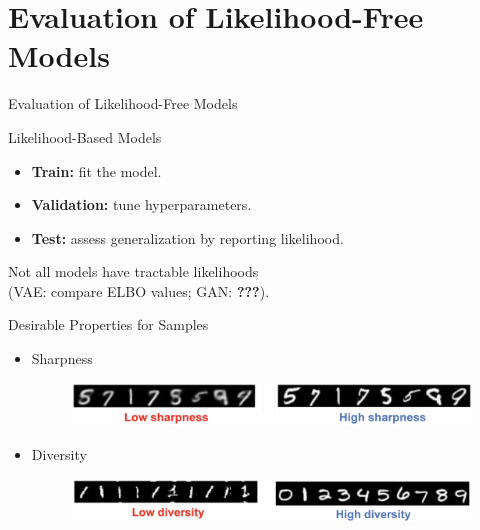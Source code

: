 \documentclass{beamer}
\begin{document}
\section{Evaluation of Likelihood-Free Models}
\begin{frame}{Evaluation of Likelihood-Free Models}
	\begin{block}{Likelihood-Based Models}
		\begin{itemize}
			\item \textbf{Train:} fit the model.
			\item \textbf{Validation:} tune hyperparameters.
			\item \textbf{Test:} assess generalization by reporting likelihood.
		\end{itemize}
	\end{block}
	\eqpause
	Not all models have tractable likelihoods \\ (VAE: compare ELBO values; GAN: \textbf{???}).
	\eqpause
	\begin{block}{Desirable Properties for Samples}
		\begin{itemize}
			\item Sharpness
			\begin{figure}
				\centering
				\includegraphics[width=0.9\linewidth]{figs/sharpness}
			\end{figure}
			\eqpause
			\item Diversity
			\begin{figure}
				\centering
				\includegraphics[width=0.9\linewidth]{figs/diversity}
			\end{figure}
		\end{itemize}
	\end{block}
\end{frame}
\end{document}
